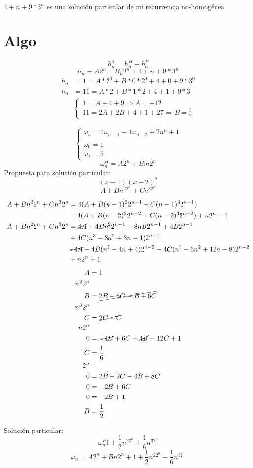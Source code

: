 \documentclass[../main.tex]{subfiles}
\begin{document}
$4+n+9*3^n$ es una solución particular de mi recurrencia no-homogénea

\section{Algo}%
\label{sec:Algo}
\[
	h_n^4 = h_n^H+h_n^P
\]
\[
	h_n=A2^n+B_n2^n+4+n+9*3^n
\]
\begin{align*}
	h_0 &= 1=A*2^0+B*0*2^0+4+0+9*3^0\\
	h_0 &= 11=A*2+B*1*2+4+1+9*3\\
	&\begin{cases}
		1 = A+4+9 \Longrightarrow A=-12\\
		11 = 2A+2B+4+1+27 \Longrightarrow B= \frac{3}{2}
	\end{cases}
\end{align*}

\[
	\begin{cases}
		\omega_n = 4\omega_{n-1}-4\omega_{n-2}+2n^n+1\\
		\\
		\omega_0 = 1\\
		\omega_1 = 5
	\end{cases}
\]
\[
	\omega_n^H=A2^n+Bm2^n
\]
Propuesta para solución particular:
\[
	(x-1)(x-2)^2
\]
\[
	A+Bn^22^n+Cn^32^n
\]

\begin{align*}
	A+Bn^22^n+Cn^32^n&=
	4(A+B(n-1)^22^{n-1}+C(n-1)^32^{n-1})\\
	&-4(A+B(n-2)^22^{n-2}+C(n-2)^32^{n-2})
	+n2^n+1\\
	A+Bn^22^n+Cn^32^n&=
	\cancel{4A}+4Bn^22^{n-1}-8nB2^{n-1}+4B2^{n-1}\\
	&+4C(n^3-3n^2+3n-1)2^{n-1}\\
	&\cancel{-4A}-4B(n^2-4n+4)2^{n-2}-4C(n^3-6n^2+12n-8)2^{n-2}\\
	&+n2^n+1
\end{align*}
\begin{align*}
	A&=1\\
	n^22^n\\
	B&=\cancel{2B-6C-B+6C}\\
	n^32^n\\
	C&=\cancel{2C-C}\\
	n2^n\\
	0&=\cancel{-4B}+6C+\cancel{4B}-12C+1\\
	C &= \frac{1}{6}\\
	2^n\\
	0&=2B-2C-4B+8C\\
	0&=-2B+6C\\
	0&=-2B+1\\
	B &= \frac{1}{2}
\end{align*}

Solución particular:
\[
	\omega_n^P1+ \frac{1}{2}n^22^n+\frac{1}{6}n^32^n
\]
\[
	\omega_n=A2^n+Bn2^n+1+\frac{1}{2}n^22^n+\frac{1}{6}n^32^n
\]
\end{document}
